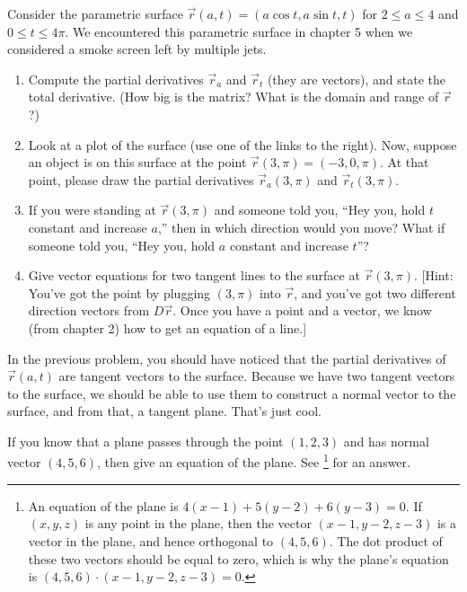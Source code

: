 \begin{problem}
 Consider the parametric surface $\vec r(a,t) = (a\cos t, a\sin t, t)$ for $2\leq a\leq 4$ and $0\leq t\leq 4\pi$. We encountered this parametric surface in chapter 5 when we considered a smoke screen left by multiple jets.
\begin{enumerate}
 \item Compute the partial derivatives $\vec r_a$ and $\vec r_t$ (they are vectors), and state the total derivative. (How big is the matrix? What is the domain and range of $\vec r$?)
 \item {}%
Look at a plot of the surface (use one of the links to the right). Now, suppose an object is on this surface at the point $\vec r(3,\pi) = (-3,0,\pi)$. At that point, please draw the partial derivatives $\vec r_a(3,\pi)$ and $\vec r_t(3,\pi)$.  
 \item If you were standing at $\vec r(3,\pi)$ and someone told you, ``Hey you, hold $t$ constant and increase $a$,'' then in which direction would you move? What if someone told you, ``Hey you, hold $a$ constant and increase $t$''?
 \item Give vector equations for two tangent lines to the surface at $\vec r(3,\pi)$.   [Hint: You've got the point by plugging $(3,\pi)$ into $\vec r$, and you've got two different direction vectors from $D\vec r$. Once you have a point and a vector, we know (from chapter 2) how to get an equation of a line.]
\end{enumerate}
  
\end{problem}

In the previous problem, you should have noticed that the partial derivatives of $\vec r(a,t)$ are tangent vectors to the surface. Because we have two tangent vectors to the surface, we should be able to use them to construct a normal vector to the surface, and from that, a tangent plane. That's just cool.

\begin{review*}
 If you know that a plane passes through the point $(1,2,3)$ and has normal vector $(4,5,6)$, then give an equation of the plane.  See \footnote{An equation of the plane is $4(x-1)+5(y-2)+6(y-3)=0$. If $(x,y,z)$ is any point in the plane, then the vector $(x-1,y-2,z-3)$ is a vector in the plane, and hence orthogonal to $(4,5,6)$. The dot product of these two vectors should be equal to zero, which is why the plane's equation is $(4,5,6)\cdot (x-1,y-2,z-3)=0$.} for an answer.
\end{review*}


